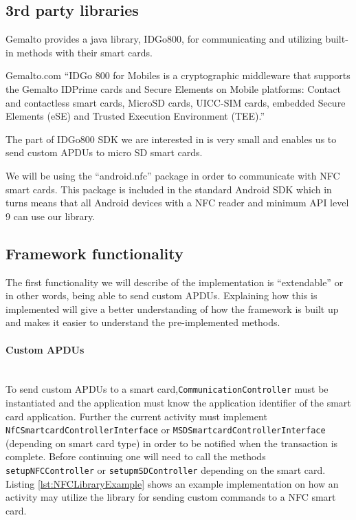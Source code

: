 \subsection{3rd party libraries}
\label{sec:gemaltoApp}
Gemalto provides a java library, IDGo800, for communicating and utilizing built-in methods with their smart cards.

\begin{aquote}{Gemalto.com \cite{GemaltoIDGo800}}
``IDGo 800 for Mobiles is a cryptographic middleware that supports the Gemalto IDPrime cards and Secure Elements on Mobile platforms: Contact and contactless smart cards, MicroSD cards, UICC-SIM cards, embedded Secure Elements (eSE) and Trusted Execution Environment (TEE).''
\end{aquote}

The part of IDGo800 SDK we are interested in is very small and enables us to send custom APDUs to micro SD smart cards.

We will be using the ``android.nfc'' package in order to communicate with NFC smart cards. This package is included in the standard Android SDK which in turns means that all Android devices with a NFC reader and minimum API level 9 \cite{androidNFCminSDK} can use our library.

\subsection{Framework functionality}
\label{sec:func}
The first functionality we will describe of the implementation is ``extendable'' or in other words, being able to send custom APDUs. Explaining how this is implemented will give a better understanding of how the framework is built up and makes it easier to understand the pre-implemented methods.

\paragraph{Custom APDUs}\mbox{}\\
To send custom APDUs to a smart card,\texttt{CommunicationController} must be instantiated and the application must know the application identifier of the smart card application. Further the current activity must implement\\ \texttt{NfCSmartcardControllerInterface} or \texttt{MSDSmartcardControllerInterface} (depending on smart card type) in order to be notified when the transaction is complete. Before continuing one will need to call the methods \texttt{setupNFCController} or \texttt{setupmSDController} depending on the smart card. Listing \ref{lst:NFCLibraryExample} shows an example implementation on how an activity may utilize the library for sending custom commands to a NFC smart card.

